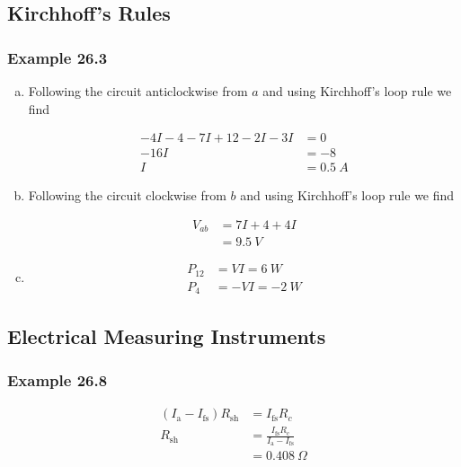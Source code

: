 \documentclass{article}
\begin{document}
\subsection{Kirchhoff's Rules}

\subsubsection{Example 26.3}

\begin{enumerate}[(a)]
  \item Following the circuit anticlockwise from $a$ and using Kirchhoff's loop rule we find

        \begin{align*}
          -4 I - 4 - 7 I + 12 - 2 I - 3 I & = 0            \\
          -16 I                           & = -8           \\
          I                               & = \qty{0.5}{A}
        \end{align*}

  \item Following the circuit clockwise from $b$ and using Kirchhoff's loop rule we find

        \begin{align*}
          V_{ab} & = 7 I + 4 + 4 I \\
                 & = \qty{9.5}{V}
        \end{align*}

  \item

        \begin{align*}
          P_{12} & = V I = \qty{6}{W}   \\
          P_{4}  & = -V I = \qty{-2}{W}
        \end{align*}
\end{enumerate}

\subsection{Electrical Measuring Instruments}

\subsubsection{Example 26.8}

\begin{align*}
  (I_\textrm{a} - I_\textrm{fs}) R_\textrm{sh} & = I_\textrm{fs} R_c                                               \\
  R_\textrm{sh}                                & = \frac{I_\textrm{fs} R_\textrm{c}}{I_\textrm{a} - I_\textrm{fs}} \\
                                               & = \qty{0.408}{\Omega}
\end{align*}
\end{document}
